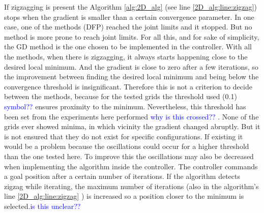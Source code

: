 If zigzagging is present the Algorithm \ref{alg:2D_alg} (see line \ref{2D_alg:line:zigzag}) stops when the gradient is smaller than a certain convergence parameter. In one case, one of the methods (DFP) reached the joint limits and it stopped. But no method is more prone to reach joint limits. For all this, and for sake of simplicity, the GD method is the one chosen to be implemented in the controller.
With all the methods, when there is zigzagging, it always starts happening close to the desired local minimum. And the gradient is close to zero after a few iterations, so the improvement
between finding the desired local minimum and being below the convergence threshold is insignificant. Therefore this is not a criterion to decide between the methods,
because for the tested grids the threshold used (0.1) \textcolor{blue}{symbol?? } ensures proximity to the minimum.
Nevertheless, this threshold has been set from the experiments here performed \textcolor{blue}{why is this crossed?? }. None of the grids ever showed minima, in which vicinity the gradient changed abruptly. But it is not ensured that they do not exist for specific configurations. If existing it would be a problem because the oscillations could occur for a higher threshold than the one tested here. To improve this the oscillations may also be decreased when implementing the algorithm inside the
controller. 
The controller commands a goal position after a certain number of iterations. If the algorithm detects zigzag while iterating, the maximum number of iterations (also in the algorithm's line \ref{2D_alg:line:zigzag} ) is increased so a position closer to the minimum is selected.\textcolor{blue}{is this unclear?? }

